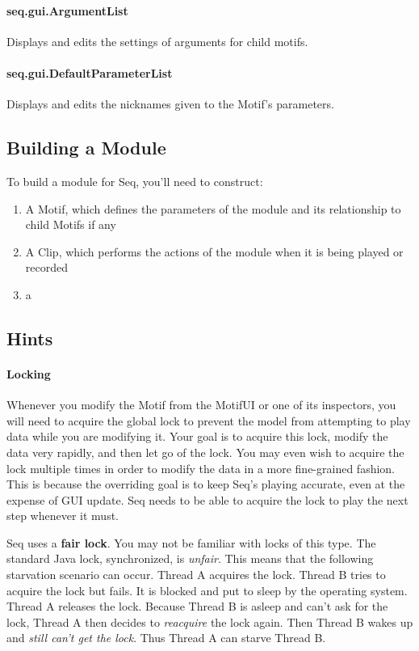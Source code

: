 \documentclass[twoside,10pt]{article}
\begin{document}
\paragraph{seq.gui.ArgumentList} Displays and edits the settings of arguments for child motifs.

\paragraph{seq.gui.DefaultParameterList} Displays and edits the nicknames given to the Motif's parameters.

\subsection{Building a Module}

To build a module for Seq, you'll need to construct:

\begin{enumerate}
\item A Motif, which defines the parameters of the module and its relationship to child Motifs if any
\item A Clip, which performs the actions of the module when it is being played or recorded
\item a 
\end{enumerate}

\subsection{Hints}

\paragraph{Locking}
Whenever you modify the Motif from the MotifUI or one of its inspectors, you will need to acquire the global lock to prevent the model from attempting to play data while you are modifying it.  Your goal is to acquire this lock, modify the data very rapidly, and then let go of the lock.  You may even wish to acquire the lock multiple times in order to modify the data in a more fine-grained fashion.  This is because the overriding goal is to keep Seq's playing accurate, even at the expense of GUI update.  Seq needs to be able to acquire the lock to play the next step whenever it must.

Seq uses a {\bf fair lock}.  You may not be familiar with locks of this type.   The standard Java lock, {\sf synchronized}, is {\it unfair}.  This means that the following starvation scenario can occur.  Thread A acquires the lock.  Thread B tries to acquire the lock but fails.  It is blocked and put to sleep by the operating system.  Thread A releases the lock.  Because Thread B is asleep and can't ask for the lock, Thread A then decides to {\it reacquire} the lock again.  Then Thread B wakes up and {\it still can't get the lock}.  Thus Thread A can starve Thread B.
\end{document}
